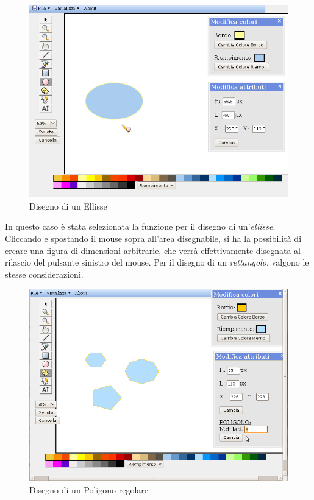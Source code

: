 \begin{figure}[!ht]
\centering
\includegraphics[scale=0.5]{images/ellisse.png}
\caption{Disegno di un Ellisse}
\end{figure}
 
\vspace{100pt}
In questo caso \`e stata selezionata la funzione per il disegno di un'\textit{ellisse}. Cliccando e spostando il mouse sopra all'area disegnabile, si ha la possibilit\` a di creare una figura di dimensioni arbitrarie, che verr\` a effettivamente disegnata al rilascio del pulsante sinistro del mouse. Per il disegno di un \textit{rettangolo}, valgono le stesse considerazioni.
\newpage
 
 
\begin{figure}[!ht]
\centering
\includegraphics[scale=0.5]{images/poligono.png}
\caption{Disegno di un Poligono regolare}
\end{figure}
 
